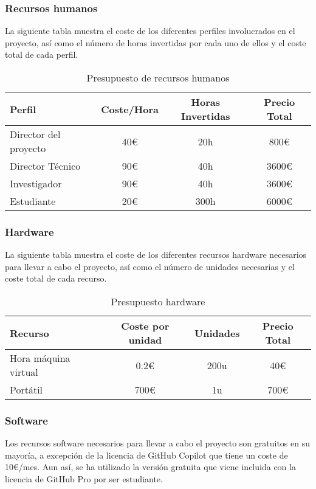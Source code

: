 \subsubsection{Recursos humanos}
La siguiente tabla muestra el coste de los diferentes perfiles involucrados en el proyecto,
así como el número de horas invertidas por cada uno de ellos y el coste total de cada perfil.

\begin{table}[ht]
    \centering
    \begin{tabular}[ht]{l|c|c|c} 
        \textbf{Perfil} & \textbf{Coste/Hora} & \textbf{Horas Invertidas} & \textbf{Precio Total}\\
        \hline
        Director del proyecto   & 40\euro   & 20h    & 800\euro   \\
        Director Técnico        & 90\euro   & 40h    & 3600\euro  \\
        Investigador            & 90\euro   & 40h    & 3600\euro  \\
        Estudiante              & 20\euro   & 300h   & 6000\euro   \\
    \end{tabular}
    \caption{Presupuesto de recursos humanos}
    \label{tab:huma-resources}
\end{table}

\subsubsection{Hardware}
La siguiente tabla muestra el coste de los diferentes recursos hardware necesarios para
llevar a cabo el proyecto, así como el número de unidades necesarias y el coste total de
cada recurso. 

\begin{table}[ht]
    \centering
    \begin{tabular}[ht]{l|c|c|c} 
        \textbf{Recurso} & \textbf{Coste por unidad} & \textbf{Unidades} & \textbf{Precio Total}\\
        \hline
        Hora máquina virtual       & 0.2\euro      & 200u   & 40\euro    \\
        Portátil                    & 700\euro      & 1u    & 700\euro   \\
    \end{tabular}
    \caption{Presupuesto hardware}
    \label{tab:hardware-budget}
\end{table}

\subsubsection{Software}
Los recursos software necesarios para llevar a cabo el proyecto son gratuitos en su mayoría, 
a excepción de la licencia de GitHub Copilot que tiene un coste de 10\euro/mes. Aun así, se ha
utilizado la versión gratuita que viene incluida con la licencia de GitHub Pro por ser estudiante. 

